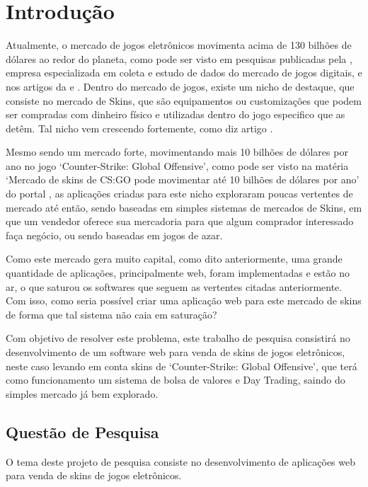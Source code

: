 
\chapter[Introdução]{Introdução}
Atualmente, o mercado de jogos eletrônicos movimenta acima de 130 bilhões de dólares ao redor do planeta, como pode ser visto em pesquisas publicadas pela , empresa especializada em coleta e estudo de dados do mercado de jogos digitais, e nos artigos da  e . Dentro do mercado de jogos, existe um nicho de destaque, que consiste no mercado de Skins, que são equipamentos ou customizações que podem ser compradas com dinheiro físico e utilizadas dentro do jogo especifico que as detêm. Tal nicho vem crescendo fortemente, como diz artigo .

Mesmo sendo um mercado forte, movimentando mais 10 bilhões de dólares por ano no jogo ‘Counter-Strike: Global Offensive’, como pode ser visto na matéria ‘Mercado de skins de CS:GO pode movimentar até 10 bilhões de dólares por ano’ do portal , as aplicações criadas para este nicho exploraram poucas vertentes de mercado até então, sendo baseadas em simples sistemas de mercados de Skins, em que um vendedor oferece sua mercadoria para que algum comprador interessado faça negócio, ou sendo baseadas em jogos de azar.

Como este mercado gera muito capital, como dito anteriormente, uma grande quantidade de aplicações, principalmente web, foram implementadas e estão no ar, o que saturou os softwares que seguem as vertentes citadas anteriormente. Com isso, como seria possível criar uma aplicação web para este mercado de skins de forma que tal sistema não caia em saturação?

Com objetivo de resolver este problema, este trabalho de pesquisa consistirá no desenvolvimento de um software web para venda de skins de jogos eletrônicos, neste caso levando em conta skins de ‘Counter-Strike: Global Offensive’, que terá como funcionamento um sistema de bolsa de valores e Day Trading, saindo do simples mercado já bem explorado.

\section{Questão de Pesquisa}
O tema deste projeto de pesquisa consiste no desenvolvimento de aplicações web para venda de skins de jogos eletrônicos.

